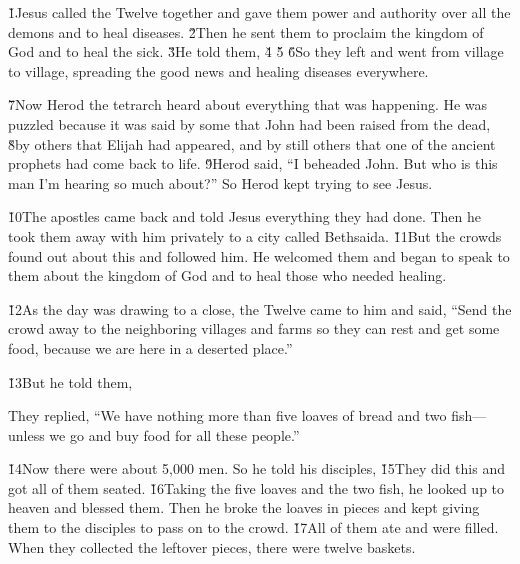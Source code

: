 \v{1}Jesus called the Twelve together and gave them power and authority over all the demons and to heal diseases. \v{2}Then he sent them to proclaim the kingdom of God and to heal the sick. \v{3}He told them,  \v{4} \v{5} \v{6}So they left and went from village to village, spreading the good news and healing diseases everywhere.

\v{7}Now Herod the tetrarch heard about everything that was happening. He was puzzled because it was said by some that John had been raised from the dead, \v{8}by others that Elijah had appeared, and by still others that one of the ancient prophets had come back to life. \v{9}Herod said, ``I beheaded John. But who is this man I'm hearing so much about?'' So Herod kept trying to see Jesus.

\v{10}The apostles came back and told Jesus everything they had done. Then he took them away with him privately to a city called Bethsaida. \v{11}But the crowds found out about this and followed him. He welcomed them and began to speak to them about the kingdom of God and to heal those who needed healing.

\v{12}As the day was drawing to a close, the Twelve came to him and said, ``Send the crowd away to the neighboring villages and farms so they can rest and get some food, because we are here in a deserted place.''

\v{13}But he told them, 

They replied, ``We have nothing more than five loaves of bread and two fish---unless we go and buy food for all these people.''

\v{14}Now there were about 5,000 men. So he told his disciples,  \v{15}They did this and got all of them seated. \v{16}Taking the five loaves and the two fish, he looked up to heaven and blessed them. Then he broke the loaves in pieces and kept giving them to the disciples to pass on to the crowd. \v{17}All of them ate and were filled. When they collected the leftover pieces, there were twelve baskets.


